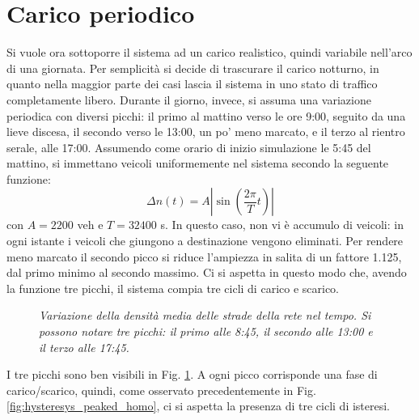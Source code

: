 \documentclass[../main.tex]{subfiles}
\begin{document}
\section{Carico periodico}
Si vuole ora sottoporre il sistema ad un carico realistico, quindi variabile nell'arco di una giornata.
Per semplicit\`a si decide di trascurare il carico notturno, in quanto nella maggior parte dei casi lascia il sistema in uno stato di traffico completamente libero.
Durante il giorno, invece, si assuma una variazione periodica con diversi picchi: il primo al mattino verso le ore 9:00, seguito da una lieve discesa, il secondo verso le 13:00, un po' meno marcato, e il terzo al rientro serale, alle 17:00.
Assumendo come orario di inizio simulazione le 5:45 del mattino, si immettano veicoli uniformemente nel sistema secondo la seguente funzione:
\begin{equation}
    \Delta n(t) = A \left\lvert \sin\left(\frac{2\pi}{T}t\right) \right\rvert 
\end{equation}
con $A = 2200$ veh e $T = 32400$ s.
In questo caso, non vi \`e accumulo di veicoli: in ogni istante i veicoli che giungono a destinazione vengono eliminati.
Per rendere meno marcato il secondo picco si riduce l'ampiezza in salita di un fattore 1.125, dal primo minimo al secondo massimo.
Ci si aspetta in questo modo che, avendo la funzione tre picchi, il sistema compia tre cicli di carico e scarico.
\begin{figure}[H]
    \centering
    \caption[Variazione periodica della densit\`a in un reticolo omogeneo]{\emph{Variazione della densit\`a media delle strade della rete nel tempo. Si possono notare tre picchi: il primo alle 8:45, il secondo alle 13:00 e il terzo alle 17:45.}}
    \label{fig:density_time_periodic_homo}
\end{figure}
I tre picchi sono ben visibili in Fig. \ref{fig:density_time_periodic_homo}.
A ogni picco corrisponde una fase di carico/scarico, quindi, come osservato precedentemente in Fig. \ref{fig:hysteresys_peaked_homo}, ci si aspetta la presenza di tre cicli di isteresi.
\end{document}
